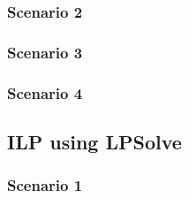 \subsubsection{Scenario 2}

\subsubsection{Scenario 3}

\subsubsection{Scenario 4}


\subsection{ILP using LPSolve}

\subsubsection{Scenario 1}

